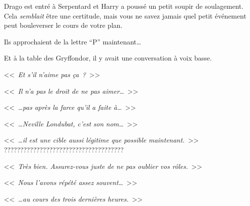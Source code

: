 \later

Drago est entré à Serpentard et Harry a poussé un petit soupir de soulagement. Cela \emph{semblait} être une certitude, mais vous ne savez jamais quel petit événement peut bouleverser le cours de votre plan.

Ils approchaient de la lettre “P” maintenant…

Et à la table des Gryffondor, il y avait une conversation à voix basse.

<<~\emph{Et s'il n'aime pas ça~?}~>>

<<~\emph{Il n'a pas le droit de ne pas aimer…}~>>

<<~\emph{…pas après la farce qu'il a faite à…}~>>

<<~\emph{…Neville Londubat, c'est son nom…}~>>

<<~\emph{…il est une cible aussi légitime que possible maintenant.}~>> ?????????????????????????????????????

<<~\emph{Très bien. Assurez-vous juste de ne pas oublier vos rôles.}~>>

<<~\emph{Nous l'avons répété assez souvent…}~>>

<<~\emph{…au cours des trois dernières heures.}~>>

